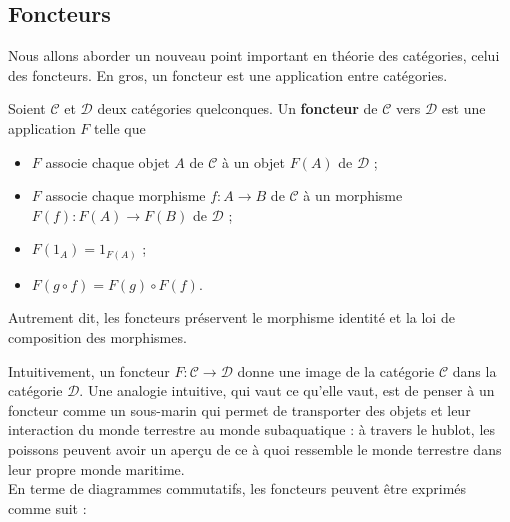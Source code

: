 \documentclass{article}
\begin{document}
\subsection{Foncteurs}
Nous allons aborder un nouveau point important en théorie des catégories, celui des foncteurs. En gros, un foncteur est une application entre catégories.

\begin{definition}[Foncteur]{}
    Soient $\mathcal C$ et $\mathcal D$ deux catégories quelconques. Un \textbf{foncteur} de $\mathcal C$ vers $\mathcal D$ est une application $F$ telle que
    \begin{itemize}[label=\textbullet]
        \item $F$ associe chaque objet $A$ de $\mathcal C$ à un objet $F(A)$ de $\mathcal D$ ;
        \item $F$ associe chaque morphisme $f:A\to B$ de $\mathcal C$ à un morphisme $F(f):F(A)\to F(B)$ de $\mathcal D$ ;
        \item $F(1_A)=1_{F(A)}$ ;
        \item $F(g\circ f)=F(g)\circ F(f)$.
    \end{itemize}
    Autrement dit, les foncteurs préservent le morphisme identité et la loi de composition des morphismes.
\end{definition}

Intuitivement, un foncteur $F:\mathcal C\to\mathcal D$ donne une image de la catégorie $\mathcal C$ dans la catégorie $\mathcal D$. Une analogie intuitive, qui vaut ce qu'elle vaut, est de penser à un foncteur comme un sous-marin qui permet de transporter des objets et leur interaction du monde terrestre au monde subaquatique : à travers le hublot, les poissons peuvent avoir un aperçu de ce à quoi ressemble le monde terrestre dans leur propre monde maritime.\\

En terme de diagrammes commutatifs, les foncteurs peuvent être exprimés comme suit :

\begin{center}
\end{center}
\end{document}
